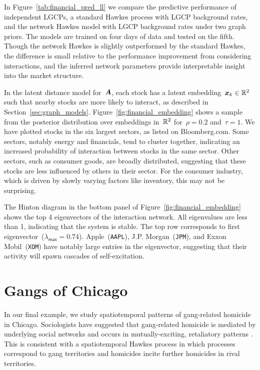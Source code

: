 \textbf{}
In Figure~\ref{tab:financial_pred_ll} we compare the predictive performance of independent LGCPs, a standard Hawkes process with LGCP background rates, and the network Hawkes model with LGCP background rates under two graph priors. The models are trained on four days of data and tested on the fifth. Though the network Hawkes is slightly outperformed by the standard Hawkes, the difference is small relative to the performance improvement from considering interactions, and the inferred network parameters provide interpretable insight into the market structure.

In the latent distance model for~$\boldsymbol{A}$, each stock has a latent embedding~${\boldsymbol{x}_k\in\mathbb{R}^2}$ such that nearby stocks are more likely to interact, as described in Section~\ref{sec:graph_models}. Figure~\ref{fig:financial_embedding} shows a sample from the posterior distribution over embeddings in~$\mathbb{R}^2$ for~${\rho=0.2}$ and~${\tau=1}$. We have plotted stocks in the six largest sectors, as listed on Bloomberg.com. Some sectors, notably energy and financials, tend to cluster together, indicating an increased probability of interaction between stocks in the same sector. Other sectors, such as consumer goods, are broadly distributed, suggesting that these stocks are less influenced by others in their sector. For the consumer industry, which is driven by slowly varying factors like inventory, this may not be surprising.  

The Hinton diagram in the bottom panel of Figure~\ref{fig:financial_embedding} shows the top 4 eigenvectors of the interaction network. All eigenvalues are less than 1, indicating that the system is stable. The top row corresponds to first eigenvector~(${\lambda_{\mathsf{max}}=0.74}$). Apple~(\texttt{AAPL}), J.P. Morgan~(\texttt{JPM}), and Exxon Mobil~(\texttt{XOM}) have notably large entries in the eigenvector, suggesting that their activity will spawn cascades of self-excitation. 

\section{Gangs of Chicago}
\label{sec:chicago}
In our final example, we study spatiotemporal patterns of gang-related homicide in Chicago. Sociologists have suggested that gang-related homicide is mediated by underlying social networks and occurs in mutually-exciting, retaliatory patterns \cite{Papachristos-2009}. This is consistent with a spatiotemporal Hawkes process in which processes correspond to gang territories and homicides incite further homicides in rival territories.

